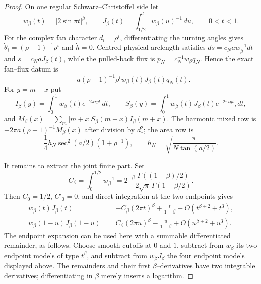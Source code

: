 \documentclass[11pt]{amsart}
\numberwithin{equation}{section}
\theoremstyle{definition}
\theoremstyle{remark}
\begin{document}
\begin{proof}
On one regular Schwarz--Christoffel side let
\[
 w_\beta(t)=|2\sin\pi t|^\beta,\qquad
 J_\beta(t)=\int_{1/2}^t w_\beta(u)^{-1}\,du,\qquad 0<t<1.
\]
For the complex fan character $d_i=\rho^i$, differentiating the turning
angles gives $\dot\theta_i=(\rho-1)^{-1}\rho^i$ and $\dot h=0$.
Centred physical arclength satisfies
$ds=c_Naw_\beta^{-1}dt$ and $s=c_NaJ_\beta(t)$, while the pulled-back
flux is $p_N=c_N^{-1}w_\beta q_N$.  Hence the exact fan--flux datum is
\[
 -a(\rho-1)^{-1}\rho^i w_\beta(t)J_\beta(t)q_N(t).
\]
For $y=m+x$ put
\[
 I_\beta(y)=\int_0^1w_\beta(t)e^{-2\pi iyt}\,dt,\qquad
 S_\beta(y)=\int_0^1w_\beta(t)J_\beta(t)e^{-2\pi iyt},dt,
\]
and $M_\beta(x)=\sum_m|m+x|S_\beta(m+x)\overline{I_\beta(m+x)}$.
The harmonic mixed row is
$-2\pi a(\rho-1)^{-1}M_\beta(x)$ after division by $d_\circ^2$; the area
row is
\[
 \frac14h_N\sec^2(a/2)(1+\rho^{-1}),\qquad
 h_N=\sqrt{\frac\pi{N\tan(a/2)}}.
\]

It remains to extract the joint finite part.  Set
\[
 C_\beta=\int_0^{1/2}w_\beta^{-1}
 =2^{-\beta}\frac{\Gamma((1-\beta)/2)}
 {2\sqrt\pi\,\Gamma(1-\beta/2)}.
\]
Then $C_0=1/2$, $C'_0=0$, and direct integration at the two endpoints
gives
\begin{align*}
 w_\beta(t)J_\beta(t)
 &=-C_\beta(2\pi t)^\beta+\frac{t}{1-\beta}
   +O(t^{\beta+2}+t^3),\\
 w_\beta(1-u)J_\beta(1-u)
 &= C_\beta(2\pi u)^\beta-\frac{u}{1-\beta}
   +O(u^{\beta+2}+u^3).
\end{align*}
The endpoint expansion can be used here with a summable differentiated
remainder, as follows.  Choose smooth cutoffs at $0$ and $1$, subtract
from $w_\beta$ its two endpoint models of type $t^\beta$, and subtract
from $w_\beta J_\beta$ the four endpoint models displayed above.  The
remainders and their first $\beta$--derivatives have two integrable
derivatives; differentiating in $\beta$ merely inserts a logarithm.


\end{proof}
\end{document}
